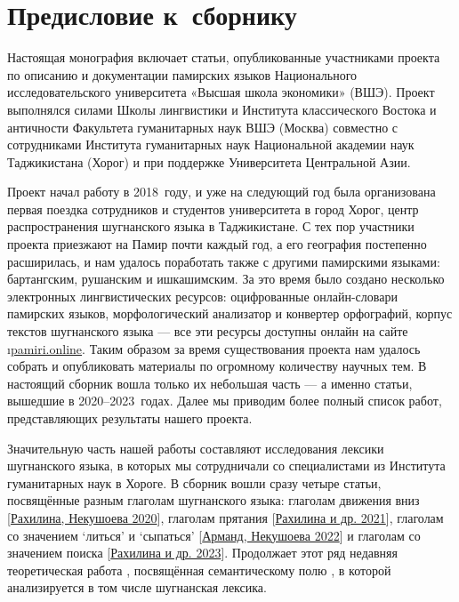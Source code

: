 \chapter*{Предисловие к~сборнику}
\setcounter{page}{2}
\setcounter{section}{0}
\label{chapter-intro}

Настоящая монография включает статьи, опубликованные участниками проекта по описанию и документации памирских языков Национального исследовательского университета «Высшая школа экономики» (ВШЭ). Проект выполнялся силами Школы лингвистики и Института классического Востока и античности Факультета гуманитарных наук ВШЭ (Москва) совместно с сотрудниками Института гуманитарных наук Национальной академии наук Таджикистана (Хорог) и при поддержке Университета Центральной Азии.

Проект начал работу в 2018~году, и уже на следующий год была организована первая поездка сотрудников и студентов университета в город Хорог, центр распространения шугнанского языка в Таджикистане. С тех пор участники проекта приезжают на Памир почти каждый год, а его география постепенно расширилась, и нам удалось поработать также с другими памирскими языками: бартангским, рушанским и ишкашимским. За это время было создано несколько электронных лингвистических ресурсов: оцифрованные онлайн-словари памирских языков, морфологический анализатор и конвертер орфографий, корпус текстов шугнанского языка — все эти ресурсы доступны онлайн на сайте \i{\href{https://pamiri.online}{pamiri.online}}. Таким образом за время существования проекта нам удалось собрать и опубликовать материалы по огромному количеству научных тем. В настоящий сборник вошла только их небольшая часть — а именно статьи, вышедшие в 2020–2023~годах. Далее мы приводим более полный список работ, представляющих результаты нашего проекта.

Значительную часть нашей работы составляют исследования лексики шугнанского языка, в которых мы сотрудничали со специалистами из Института гуманитарных наук в Хороге. В сборник вошли сразу четыре статьи, посвящённые разным глаголам шугнанского языка:
глаголам движения вниз [\b{\hyperref[chapter-rakh-down]{Рахилина, Некушоева 2020}}],
глаголам прятания [\b{\hyperref[chapter-rakh-hide]{Рахилина и др. 2021}}],
глаголам со значением ‘литься’ и ‘сыпаться’ [\b{\hyperref[chapter-armand-pour]{Арманд, Некушоева 2022}}]
и глаголам со значением поиска [\b{\hyperref[chapter-rakh-search]{Рахилина и др. 2023}}].
Продолжает этот ряд недавняя теоретическая работа \parencite{rakhilina_ryzhova2025}, посвящённая семантическому полю , в которой анализируется в том числе шугнанская лексика.

